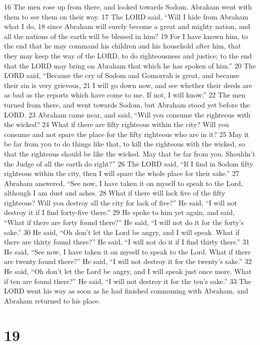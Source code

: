 {16} The men rose up from there, and looked towards Sodom. Abraham went
with them to see them on their way. {17} The LORD said, ``Will I hide
from Abraham what I do, {18} since Abraham will surely become a great
and mighty nation, and all the nations of the earth will be blessed in
him? {19} For I have known him, to the end that he may command his
children and his household after him, that they may keep the way of the
LORD, to do righteousness and justice; to the end that the LORD may
bring on Abraham that which he has spoken of him.'' {20} The LORD said,
``Because the cry of Sodom and Gomorrah is great, and because their sin
is very grievous, {21} I will go down now, and see whether their deeds
are as bad as the reports which have come to me. If not, I will know.''
{22} The men turned from there, and went towards Sodom, but Abraham
stood yet before the LORD. {23} Abraham came near, and said, ``Will you
consume the righteous with the wicked? {24} What if there are fifty
righteous within the city? Will you consume and not spare the place for
the fifty righteous who are in it? {25} May it be far from you to do
things like that, to kill the righteous with the wicked, so that the
righteous should be like the wicked. May that be far from you. Shouldn't
the Judge of all the earth do right?'' {26} The LORD said, ``If I find
in Sodom fifty righteous within the city, then I will spare the whole
place for their sake.'' {27} Abraham answered, ``See now, I have taken
it on myself to speak to the Lord, although I am dust and ashes. {28}
What if there will lack five of the fifty righteous? Will you destroy
all the city for lack of five?'' He said, ``I will not destroy it if I
find forty-five there.'' {29} He spoke to him yet again, and said,
``What if there are forty found there?'' He said, ``I will not do it for
the forty's sake.'' {30} He said, ``Oh don't let the Lord be angry, and
I will speak. What if there are thirty found there?'' He said, ``I will
not do it if I find thirty there.'' {31} He said, ``See now, I have
taken it on myself to speak to the Lord. What if there are twenty found
there?'' He said, ``I will not destroy it for the twenty's sake.'' {32}
He said, ``Oh don't let the Lord be angry, and I will speak just once
more. What if ten are found there?'' He said, ``I will not destroy it
for the ten's sake.'' {33} The LORD went his way as soon as he had
finished communing with Abraham, and Abraham returned to his place.

\hypertarget{section-18}{%
\section{19}\label{section-18}}

